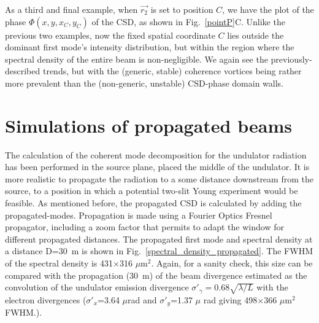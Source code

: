 \documentclass{iucr}              %
\newcommand{\inblue}[1]{{\color{blue}#1}}
\begin{document}
As a third and final example, when $\vec{r_2}$ is set to position $C$, we have the plot of the phase $\Phi(x,y,x_C,y_C)$ of the CSD, as shown in \inblue{Fig.~\ref{pointP}C}.  Unlike the previous two examples, now the fixed spatial coordinate $C$ lies outside the dominant first mode's intensity distribution, but within the region where the spectral density of the entire beam is non-negligible.  We again see the previously-described trends, but with the (generic, stable) coherence vortices being rather more prevalent than the (non-generic, unstable) CSD-phase domain walls.    


\section{Simulations of propagated beams}

The calculation of the coherent mode decomposition for the undulator radiation has been performed in the source plane, placed the middle of the undulator. It is more realistic to propagate the radiation to a some distance downstream from the source, to a position in which a potential two-slit Young experiment would be feasible. As mentioned before, the propagated CSD is calculated by adding the propagated-modes. Propagation is made using a Fourier Optics Fresnel propagator, including a zoom factor \cite{schmidt,pirro} that permits to adapt the window for different propagated distances. The propagated first mode and spectral density at a distance D=30~m is shown in \inblue{Fig.~\ref{spectral_density_propagated}}. The FWHM of the spectral density is 431$\times$316 $\mu$m$^2$. Again, for a sanity check, this size can be compared with the propagation (30~m) of the beam divergence estimated as the convolution of the undulator emission divergence $\sigma'_\gamma=0.68\sqrt{\lambda/L}$ with the electron divergences ($\sigma'_x$=3.64 $\mu$rad and $\sigma'_y$=1.37 $\mu$ rad giving 498$\times$366 $\mu$m$^2$ FWHM.). 
\end{document}
